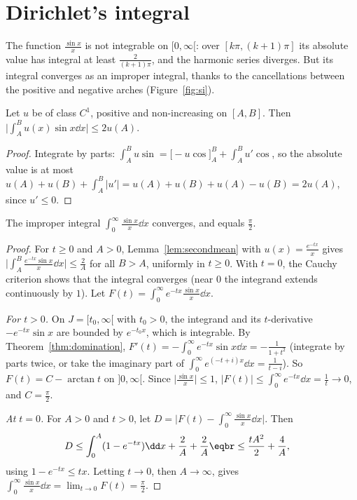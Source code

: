 \section{Dirichlet's integral}

The function $\frac{\sin x}x$ is not integrable on $[0,\infty[$: over $[k\pi,(k+1)\pi]$ its absolute value has integral at
least $\frac2{(k+1)\pi}$, and the harmonic series diverges. But its integral converges as an improper integral, thanks to the
cancellations between the positive and negative arches (Figure~\ref{fig:si}).

\begin{lemma}\label{lem:secondmean}
Let $u$ be of class $C^1$, positive and non-increasing on $[A,B]$. Then $\bigl|\int_A^Bu(x)\sin x\dd x\bigr|\le2u(A)$.
\end{lemma}
\begin{proof}
Integrate by parts: $\int_A^Bu\sin=\bigl[-u\cos\bigr]_A^B+\int_A^Bu'\cos$, so the absolute value is at most
$u(A)+u(B)+\int_A^B|u'|=u(A)+u(B)+u(A)-u(B)=2u(A)$, since $u'\le0$.
\end{proof}

\begin{theorem}[Dirichlet]\label{thm:dirichletint}
The improper integral $\int_0^\infty\frac{\sin x}x\dd x$ converges, and equals $\frac\pi2$.
\end{theorem}
\begin{proof}
For $t\ge0$ and $A>0$, Lemma~\ref{lem:secondmean} with $u(x)=\frac{e^{-tx}}x$ gives $\bigl|\int_A^B\frac{e^{-tx}\sin x}x\dd x\bigr|\le\frac2A$
for all $B>A$, uniformly in $t\ge0$. With $t=0$, the Cauchy criterion shows that the integral converges (near $0$ the integrand
extends continuously by $1$). Let $F(t)=\int_0^\infty e^{-tx}\frac{\sin x}x\dd x$.

\emph{For $t>0$.} On $J=[t_0,\infty[$ with $t_0>0$, the integrand and its $t$-derivative $-e^{-tx}\sin x$ are bounded by $e^{-t_0x}$,
which is integrable. By Theorem~\ref{thm:domination}, $F'(t)=-\int_0^\infty e^{-tx}\sin x\dd x=-\frac1{1+t^2}$ (integrate by parts twice, or take
the imaginary part of $\int_0^\infty e^{(-t+i)x}\dd x=\frac1{t-i}$). So $F(t)=C-\arctan t$ on $]0,\infty[$. Since $\bigl|\frac{\sin x}x\bigr|\le1$,
$|F(t)|\le\int_0^\infty e^{-tx}\dd x=\frac1t\to0$, and $C=\frac\pi2$.

\emph{At $t=0$.} For $A>0$ and $t>0$, let $D=\bigl|F(t)-\int_0^\infty\frac{\sin x}x\dd x\bigr|$. Then
\[
\begin{aligned}D&\le\int_0^A(1-e^{-tx})\dd x+\frac2A+\frac2A\eqbr\le\frac{tA^2}2+\frac4A,\end{aligned}
\]
using $1-e^{-tx}\le tx$. Letting $t\to0$, then $A\to\infty$, gives $\int_0^\infty\frac{\sin x}x\dd x=\lim_{t\to0}F(t)=\frac\pi2$.
\end{proof}

